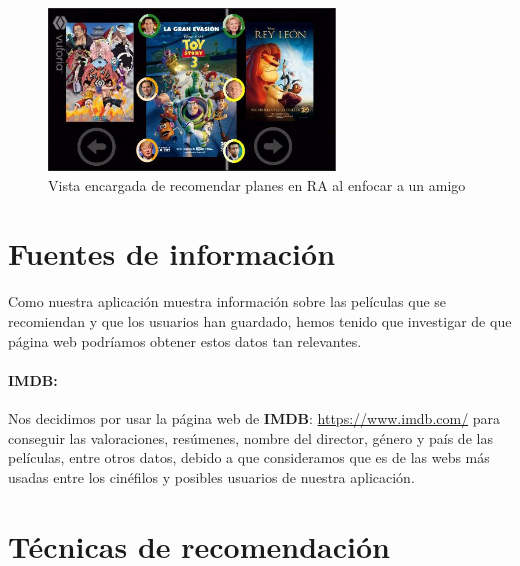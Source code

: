 \begin{flushleft}
    \begin{figure}[H]
        \centering
        \includegraphics[width=3in, angle=270]{figures/chapter-2/recomendadorAR.JPG}
        \caption{Vista encargada de recomendar planes en RA al enfocar a un amigo}
    \end{figure}
    
\end{flushleft}
\newpage
\section{Fuentes de información}
\label{makereference2.3}
Como nuestra aplicación muestra información sobre las películas que se recomiendan y que los usuarios han guardado, hemos
tenido que investigar de que página web podríamos obtener estos datos tan relevantes.
\paragraph{IMDB:}
Nos decidimos por usar la página web de \textbf{IMDB}: \url{https://www.imdb.com/} para conseguir las valoraciones, resúmenes, nombre del director,
género y país de las películas, entre otros datos, debido a que consideramos que es de las webs más usadas entre los cinéfilos y posibles 
usuarios de nuestra aplicación.

\section{Técnicas de recomendación}
\label{makereference2.6}



